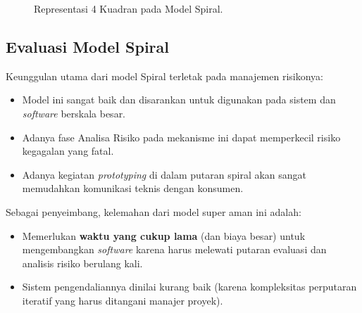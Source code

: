 \documentclass[12pt,a4paper]{article}
\begin{document}
\begin{figure}[h]
    \centering
    \caption{Representasi 4 Kuadran pada Model Spiral.}
\end{figure}

\subsection{Evaluasi Model Spiral}
Keunggulan utama dari model Spiral terletak pada manajemen risikonya:
\begin{itemize}
    \item Model ini sangat baik dan disarankan untuk digunakan pada sistem dan \textit{software} berskala besar.
    \item Adanya fase Analisa Risiko pada mekanisme ini dapat memperkecil risiko kegagalan yang fatal.
    \item Adanya kegiatan \textit{prototyping} di dalam putaran spiral akan sangat memudahkan komunikasi teknis dengan konsumen.
\end{itemize}

Sebagai penyeimbang, kelemahan dari model super aman ini adalah:
\begin{itemize}
    \item Memerlukan \textbf{waktu yang cukup lama} (dan biaya besar) untuk mengembangkan \textit{software} karena harus melewati putaran evaluasi dan analisis risiko berulang kali.
    \item Sistem pengendaliannya dinilai kurang baik (karena kompleksitas perputaran iteratif yang harus ditangani manajer proyek).
\end{itemize}
\end{document}
